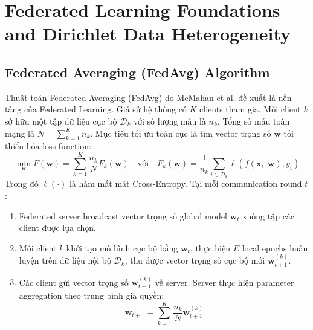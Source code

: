 \section{Federated Learning Foundations and Dirichlet Data Heterogeneity}
\label{sec:lit_fl}

\subsection{Federated Averaging (FedAvg) Algorithm}
Thuật toán Federated Averaging (FedAvg) do McMahan et al. \cite{mcmahan2017communication} đề xuất là nền tảng của Federated Learning. Giả sử hệ thống có $K$ clients tham gia. Mỗi client $k$ sở hữu một tập dữ liệu cục bộ $\mathcal{D}_k$ với số lượng mẫu là $n_k$. Tổng số mẫu toàn mạng là $N = \sum_{k=1}^K n_k$. Mục tiêu tối ưu toàn cục là tìm vector trọng số $\mathbf{w}$ tối thiểu hóa loss function:
\begin{equation}
    \min_{\mathbf{w}} F(\mathbf{w}) = \sum_{k=1}^K \frac{n_k}{N} F_k(\mathbf{w}) \quad \text{với} \quad F_k(\mathbf{w}) = \frac{1}{n_k} \sum_{i \in \mathcal{D}_k} \ell(f(\mathbf{x}_i; \mathbf{w}), y_i)
    \label{eq:fl_objective}
\end{equation}
Trong đó $\ell(\cdot)$ là hàm mất mát Cross-Entropy. Tại mỗi communication round $t$:
\begin{enumerate}
    \item Federated server broadcast vector trọng số global model $\mathbf{w}_t$ xuống tập các client được lựa chọn.
    \item Mỗi client $k$ khởi tạo mô hình cục bộ bằng $\mathbf{w}_t$, thực hiện $E$ local epochs huấn luyện trên dữ liệu nội bộ $\mathcal{D}_k$, thu được vector trọng số cục bộ mới $\mathbf{w}_{t+1}^{(k)}$.
    \item Các client gửi vector trọng số $\mathbf{w}_{t+1}^{(k)}$ về server. Server thực hiện parameter aggregation theo trung bình gia quyền:
    \begin{equation}
        \mathbf{w}_{t+1} = \sum_{k=1}^K \frac{n_k}{N} \mathbf{w}_{t+1}^{(k)}
        \label{eq:fedavg_agg}
    \end{equation}
\end{enumerate}

